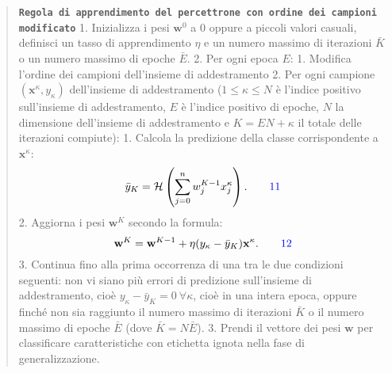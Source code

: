 \documentclass[
  letterpaper,
  DIV=11,
  numbers=noendperiod]{scrreprt}
\begin{document}
\begin{quote}
\textbf{\texttt{Regola\ di\ apprendimento\ del\ percettrone\ con\ ordine\ dei\ campioni\ modificato}}
1. Inizializza i pesi \(\mathbf{w}^0\) a \(0\) oppure a piccoli valori
casuali, definisci un tasso di apprendimento \(\eta\) e un numero
massimo di iterazioni \(\bar{K}\) o un numero massimo di epoche
\(\bar{E}\). 2. Per ogni epoca \(E\): 1. Modifica l'ordine dei campioni
dell'insieme di addestramento 2. Per ogni campione
\((\mathbf{x}^\kappa, y_\kappa)\) dell'insieme di addestramento
(\(1≤\kappa≤N\) è l'indice positivo sull'insieme di addestramento, \(E\)
è l'indice positivo di epoche, \(N\) la dimensione dell'insieme di
addestramento e \(K=EN+\kappa\) il totale delle iterazioni compiute): 1.
Calcola la predizione della classe corrispondente a
\(\mathbf{x}^\kappa\): \[
     \bar{y}_K=\mathcal{H}\left(\sum_{j=0}^{n} w_j^{K-1} x_j^\kappa\right).\tag*{\color{blue}{11}}
     \] 2. Aggiorna i pesi \(\mathbf{w}^K\) secondo la formula: \[
      \mathbf{w}^K=\mathbf{w}^{K-1}+\eta(y_\kappa-\bar{y}_K)\mathbf{x}^\kappa.\tag* {\color{blue}{12}}
      \] 3. Continua fino alla prima occorrenza di una tra le due
condizioni seguenti: non vi siano più errori di predizione sull'insieme
di addestramento, cioè \(y_\kappa-\bar{y}_K=0\ \forall \kappa\), cioè in
una intera epoca, oppure finché non sia raggiunto il numero massimo di
iterazioni \(\bar{K}\) o il numero massimo di epoche \(\bar{E}\) (dove
\(\bar{K}=N\bar{E}\)). 3. Prendi il vettore dei pesi \(\mathbf{w}\) per
classificare caratteristiche con etichetta ignota nella fase di
generalizzazione.
\end{quote}
\end{document}
